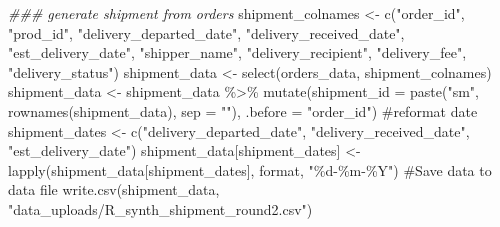\documentclass[
  letterpaper,
  DIV=11,
  numbers=noendperiod]{scrartcl}
\newenvironment{Shaded}{\begin{snugshade}}{\end{snugshade}}
\newcommand{\AttributeTok}[1]{\textcolor[rgb]{0.40,0.45,0.13}{#1}}
\newcommand{\CommentTok}[1]{\textcolor[rgb]{0.37,0.37,0.37}{#1}}
\newcommand{\DocumentationTok}[1]{\textcolor[rgb]{0.37,0.37,0.37}{\textit{#1}}}
\newcommand{\FunctionTok}[1]{\textcolor[rgb]{0.28,0.35,0.67}{#1}}
\newcommand{\NormalTok}[1]{\textcolor[rgb]{0.00,0.23,0.31}{#1}}
\newcommand{\OtherTok}[1]{\textcolor[rgb]{0.00,0.23,0.31}{#1}}
\newcommand{\SpecialCharTok}[1]{\textcolor[rgb]{0.37,0.37,0.37}{#1}}
\newcommand{\StringTok}[1]{\textcolor[rgb]{0.13,0.47,0.30}{#1}}
\begin{document}
\begin{Shaded}
\begin{Highlighting}[numbers=left,,]
\DocumentationTok{\#\#\# generate \textquotesingle{}shipment\textquotesingle{} from orders}
\NormalTok{shipment\_colnames }\OtherTok{\textless{}{-}} \FunctionTok{c}\NormalTok{(}\StringTok{"order\_id"}\NormalTok{, }\StringTok{"prod\_id"}\NormalTok{, }
                       \StringTok{"delivery\_departed\_date"}\NormalTok{,}
                       \StringTok{"delivery\_received\_date"}\NormalTok{, }\StringTok{"est\_delivery\_date"}\NormalTok{,}
                       \StringTok{"shipper\_name"}\NormalTok{, }\StringTok{"delivery\_recipient"}\NormalTok{,}
                       \StringTok{"delivery\_fee"}\NormalTok{, }\StringTok{"delivery\_status"}\NormalTok{)}
\NormalTok{shipment\_data }\OtherTok{\textless{}{-}} \FunctionTok{select}\NormalTok{(orders\_data, shipment\_colnames)}
\NormalTok{shipment\_data }\OtherTok{\textless{}{-}}\NormalTok{ shipment\_data }\SpecialCharTok{\%\textgreater{}\%} 
  \FunctionTok{mutate}\NormalTok{(}\AttributeTok{shipment\_id =} \FunctionTok{paste}\NormalTok{(}\StringTok{"sm"}\NormalTok{, }\FunctionTok{rownames}\NormalTok{(shipment\_data), }\AttributeTok{sep =} \StringTok{""}\NormalTok{), }
         \AttributeTok{.before =} \StringTok{"order\_id"}\NormalTok{)}
\CommentTok{\#reformat date}
\NormalTok{shipment\_dates }\OtherTok{\textless{}{-}} \FunctionTok{c}\NormalTok{(}\StringTok{"delivery\_departed\_date"}\NormalTok{,}
                    \StringTok{"delivery\_received\_date"}\NormalTok{, }\StringTok{"est\_delivery\_date"}\NormalTok{)}
\NormalTok{shipment\_data[shipment\_dates] }\OtherTok{\textless{}{-}} \FunctionTok{lapply}\NormalTok{(shipment\_data[shipment\_dates],}
\NormalTok{                                        format, }\StringTok{"\%d{-}\%m{-}\%Y"}\NormalTok{)}
\CommentTok{\#Save data to data file}
\FunctionTok{write.csv}\NormalTok{(shipment\_data, }\StringTok{"data\_uploads/R\_synth\_shipment\_round2.csv"}\NormalTok{)}


\end{Highlighting}
\end{Shaded}
\end{document}

